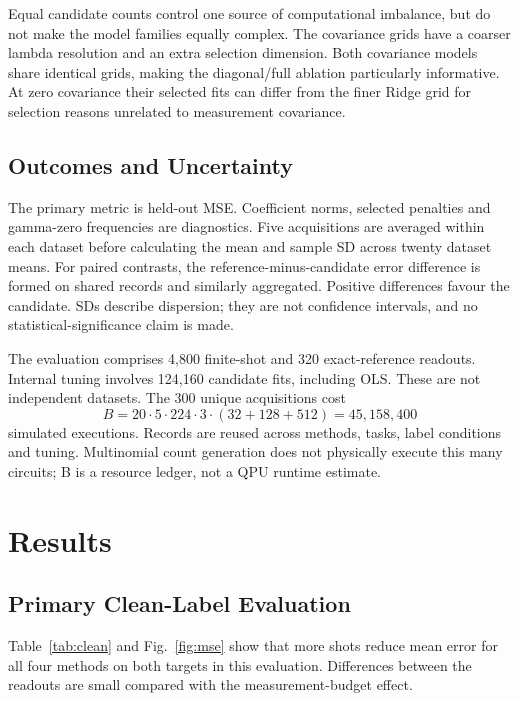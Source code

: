 \documentclass[conference]{IEEEtran}
\begin{document}
Equal candidate counts control one source of computational imbalance, but do not make the model families equally complex. The covariance grids have a coarser lambda resolution and an extra selection dimension. Both covariance models share identical grids, making the diagonal/full ablation particularly informative. At zero covariance their selected fits can differ from the finer Ridge grid for selection reasons unrelated to measurement covariance.

\subsection{Outcomes and Uncertainty}
The primary metric is held-out MSE. Coefficient norms, selected penalties and gamma-zero frequencies are diagnostics. Five acquisitions are averaged within each dataset before calculating the mean and sample SD across twenty dataset means. For paired contrasts, the reference-minus-candidate error difference is formed on shared records and similarly aggregated. Positive differences favour the candidate. SDs describe dispersion; they are not confidence intervals, and no statistical-significance claim is made.

The evaluation comprises 4,800 finite-shot and 320 exact-reference readouts. Internal tuning involves 124,160 candidate fits, including OLS. These are not independent datasets. The 300 unique acquisitions cost
\begin{equation}
B=20\cdot5\cdot224\cdot3\cdot(32+128+512)=45{,}158{,}400
\end{equation}
simulated executions. Records are reused across methods, tasks, label conditions and tuning. Multinomial count generation does not physically execute this many circuits; B is a resource ledger, not a QPU runtime estimate.

\section{Results}
\subsection{Primary Clean-Label Evaluation}
Table~\ref{tab:clean} and Fig.~\ref{fig:mse} show that more shots reduce mean error for all four methods on both targets in this evaluation. Differences between the readouts are small compared with the measurement-budget effect.

\begin{table}[t]
\caption{Clean-label test MSE, mean $\pm$ sample SD over twenty dataset means. Each finite-shot dataset mean averages five acquisitions. Exact references have one fit per dataset.}
\label{tab:clean}\centering
\resizebox{0.99\textwidth}{!}{}
\end{table}
\end{document}
